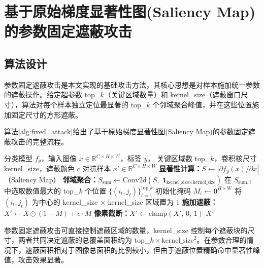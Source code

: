 \section{基于原始梯度显著性图(Saliency Map)的参数固定遮蔽攻击}

\subsection{算法设计}

参数固定遮蔽攻击是本文实现的基础攻击方法，其核心思想是对样本施加统一参数的遮蔽操作。给定超参数 top\_$k$（关键区域数量）和 kernel\_size（遮蔽窗口尺寸），算法对每个样本独立定位最显著的 top\_$k$ 个邻域聚合峰值，并在这些位置施加固定尺寸的方形遮蔽。

算法\ref{alg:fixed_attack}给出了基于原始梯度显著性图(Saliency Map)的参数固定遮蔽攻击的完整流程。

\begin{algorithm}[htbp]
  \caption{参数固定遮蔽攻击}
  \label{alg:fixed_attack}
  \begin{algorithmic}[1]
    \Require 分类模型 $f_{\theta}$，输入图像 $x \in \mathbb{R}^{C \times H \times W}$，标签 $y$，
             关键区域数 top\_$k$，卷积核尺寸 kernel\_size，遮蔽颜色 $c$
    \Ensure 对抗样本 $x' \in \mathbb{R}^{C \times H \times W}$
    \State \textbf{显著性计算：}$S \leftarrow \left|\partial f_y(x)/\partial x\right|$（Saliency Map）
    \State \textbf{邻域聚合：}$S_{\text{sum}} \leftarrow \text{Conv2d}\!\left(S,\; \mathbf{1}_{\text{kernel\_size}\times\text{kernel\_size}}\right)$
      \State 在 $S_{\text{sum},i}$ 中选取数值最大的 top\_$k$ 个位置 $\{(i_t, j_t)\}_{t=1}^{\text{top\_}k}$
      \State 初始化掩码 $M_i \leftarrow \mathbf{0}^{H \times W}$
        \State 将 $(i_t, j_t)$ 为中心的 kernel\_size $\times$ kernel\_size 区域置为 1
      \EndFor
    \EndFor
    \State \textbf{施加遮蔽：}$X' \leftarrow X \odot (1 - M) + c \cdot M$
    \State \textbf{像素截断：}$X' \leftarrow \mathrm{clamp}(X',\, 0,\, 1)$
    \State \Return $X'$
  \end{algorithmic}
\end{algorithm}



参数固定遮蔽攻击可直接控制遮蔽区域的数量，kernel\_size 控制每个遮蔽块的尺寸，两者共同决定遮蔽的总覆盖面积约为 top\_$k \times \text{kernel\_size}^2$。在参数合理的情况下，遮蔽面积相对于图像总面积的比例较小，但由于遮蔽位置精确命中显著性峰值，攻击效果显著。

